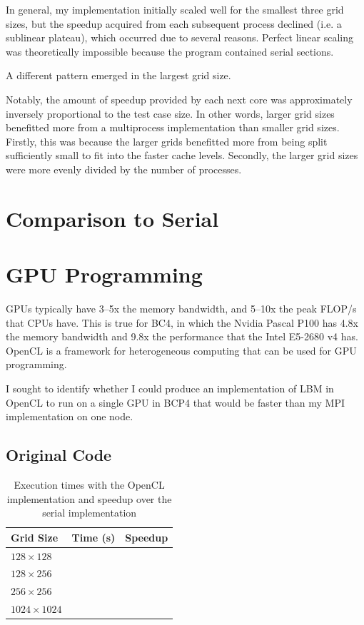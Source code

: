 \documentclass[twocolumn, a4paper]{article}
\begin{document}
In general, my implementation initially scaled well for the smallest three grid sizes, but the speedup acquired from each subsequent process declined (i.e. a sublinear plateau), which occurred due to several reasons.
Perfect linear scaling was theoretically impossible because the program contained serial sections.

A different pattern emerged in the largest grid size.

Notably, the amount of speedup provided by each next core was approximately inversely proportional to the test case size.
In other words, larger grid sizes benefitted more from a multiprocess implementation than smaller grid sizes.
Firstly, this was because the larger grids benefitted more from being split sufficiently small to fit into the faster cache levels.
Secondly, the larger grid sizes were more evenly divided by the number of processes.

\section{Comparison to Serial}

\section{GPU Programming}

GPUs typically have 3--5x the memory bandwidth, and 5--10x the peak FLOP/s that CPUs have.
This is true for BC4, in which the Nvidia Pascal P100 has 4.8x the memory bandwidth and 9.8x the performance that the Intel E5-2680 v4 has.
OpenCL is a framework for heterogeneous computing that can be used for GPU programming.

I sought to identify whether I could produce an implementation of LBM in OpenCL to run on a single GPU in BCP4 that would be faster than my MPI implementation on one node.

\subsection{Original Code}

\begin{table}[htbp]
  \begin{center}
  \caption{Execution times with the OpenCL implementation and speedup over the serial implementation}\label{tab:OpenCL_1}
  \begin{tabular}[t]{l | l l} 
      \hline\hline
      Grid Size&Time (s)&Speedup\\
      \hline
      $128 \times 128$&\texttt{}&\texttt{}\\
      $128 \times 256$&\texttt{}&\texttt{}\\
      $256 \times 256$&\texttt{}&\texttt{}\\
      $1024 \times 1024$&\texttt{}&\texttt{}\\
      \hline
    \end{tabular}
  \end{center}
\end{table}
\end{document}
